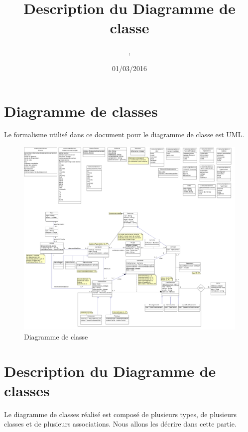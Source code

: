 \documentclass[asi, sansVersion]{picInsa}
\begin{document}
\title{Description du Diagramme de classe}
\author{\Mathieu, \Julie}
\date{01/03/2016} 

\maketitle

\tableofcontents

\chapter{Diagramme de classes}

Le formalisme utilisé dans ce document pour le diagramme de classe est UML.

\begin{landscape}
\begin{figure}
	\centering
	\includegraphics[scale=0.3]{images/diagrammeDeClasses}
	\caption{\label{modele}Diagramme de classe}
\end{figure}
\end{landscape}

\chapter{Description du Diagramme de classes}

Le diagramme de classes réalisé est composé de plusieurs types, de plusieurs classes et de plusieurs associations. Nous allons les décrire dans cette partie. \\ 
\end{document}
